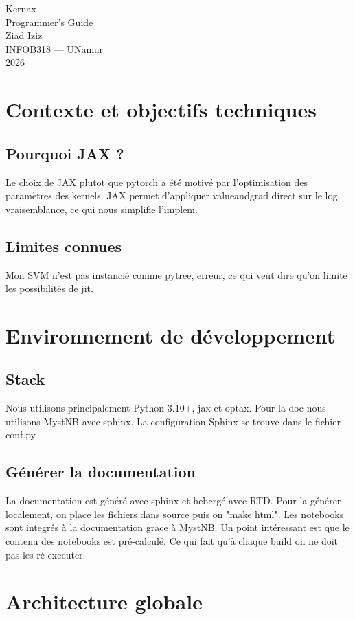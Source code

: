 \documentclass[12pt,a4paper]{report}
\begin{document}
\begin{titlepage}
    \centering
    \vspace*{4cm}
    {\Huge Kernax}\\[0.5cm]
    {\large Programmer's Guide}\\[2cm]
    {\large Ziad Iziz}\\[0.5cm]
    {\large INFOB318 --- UNamur}\\[0.5cm]
    {\large 2026}
\end{titlepage}

\tableofcontents
\newpage

\chapter{Contexte et objectifs techniques}
\section{Pourquoi JAX ?}
Le choix de JAX plutot que pytorch a été motivé par l'optimisation des paramètres des kernels.
JAX permet d'appliquer valueandgrad direct sur le log vraisemblance, ce qui nous simplifie l'implem.
\section{Limites connues}
Mon SVM n'est pas instancié comme pytree, erreur, ce qui veut dire qu'on limite les possibilités de jit.
\chapter{Environnement de développement}
\section{Stack}
Nous utilisons principalement Python 3.10+, jax et optax. Pour la doc nous utilisons MystNB avec sphinx.
La configuration Sphinx se trouve dans le fichier conf.py.
\section{Générer la documentation}
La documentation est généré avec sphinx et hebergé avec RTD. Pour la générer localement, on place les fichiers
dans source puis on "make html".
Les notebooks sont integrés à la documentation grace à MystNB.
Un point intéressant est que le contenu des notebooks est pré-calculé.
Ce qui fait qu'à chaque build on ne doit pas les ré-executer.
\chapter{Architecture globale}
\end{document}
